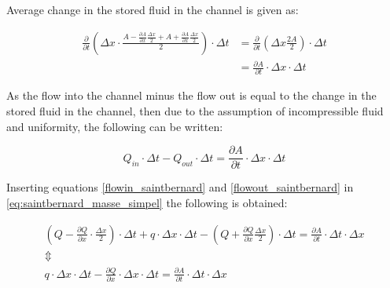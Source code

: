 Average change in the stored fluid in the channel is given as:

\begin{equation}\label{stored_saintbernard}
\begin{aligned}
\frac{\partial}{\partial t} \left(\Delta x \cdot \frac{A- \frac{\partial A}{\partial x} \frac{\Delta x}{2} +A + \frac{\partial A}{\partial x} \frac{\Delta x}{2}}{2}  \right) \cdot \Delta t 
& = \frac{\partial}{\partial t} \left( \Delta x \frac{2A}{2} \right) \cdot \Delta t \\
& = \frac{\partial A}{\partial t} \cdot \Delta x \cdot	\Delta t
\end{aligned}
\end{equation}


As the flow into the channel minus the flow out is equal to the change in the stored fluid in the channel, then due to the assumption of incompressible fluid and uniformity, the following can be written:  

\begin{equation}\label{eq:saintbernard_masse_simpel}
	Q_{in}\cdot \Delta t - Q_{out}\cdot \Delta t = \frac{\partial A}{\partial t} \cdot \Delta x	\cdot \Delta t
\end{equation}

Inserting equations \ref{flowin_saintbernard} and \ref{flowout_saintbernard} in \ref{eq:saintbernard_masse_simpel} the following is obtained:

\begin{equation}
\begin{array}{l}
	\left(Q - \frac{\partial Q}{\partial x}\cdot \frac{\Delta x}{2}\right) \cdot \Delta t + q \cdot \Delta x \cdot \Delta t - \left(Q + \frac{\partial Q}{ \partial x} \frac{\Delta x}{2} \right) \cdot \Delta t  = \frac{\partial A}{\partial t}\cdot \Delta t 
	\cdot \Delta x \\ 
\Updownarrow \\
q \cdot \Delta x \cdot \Delta t  - \frac{\partial Q}{\partial x} \cdot \Delta x \cdot \Delta t  = \frac{\partial A}{\partial t} \cdot \Delta t 
	\cdot \Delta x 
\end{array}
\label{saintbernard_masse}
\end{equation}

